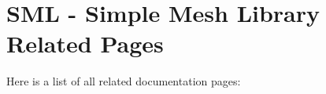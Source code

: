 \section{SML - Simple Mesh Library Related Pages}
Here is a list of all related documentation pages:\begin{CompactList}
\item {}

\end{CompactList}
